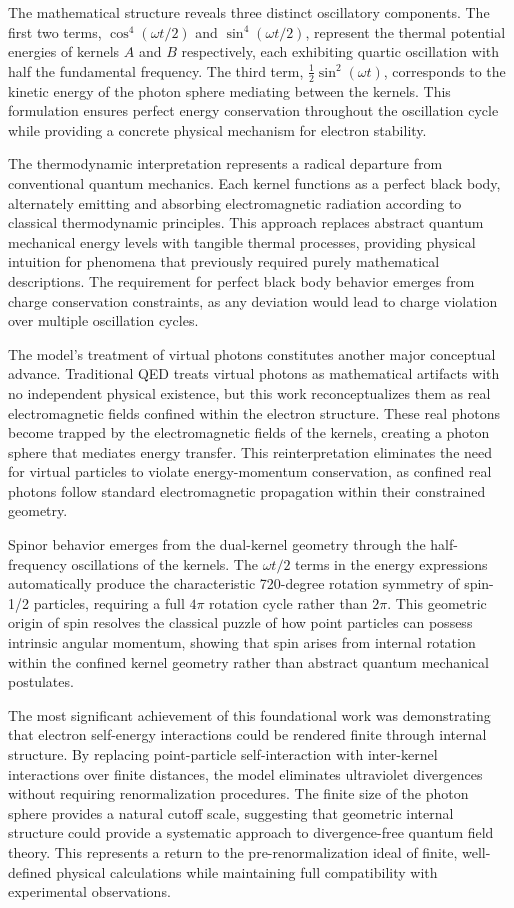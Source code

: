 \documentclass[%
 reprint,
 amsmath,amssymb,
 aps,
]{revtex4-1}
\numberwithin{equation}{section}%
\begin{document}
The mathematical structure reveals three distinct oscillatory components. The first two terms, $\cos^4(\omega t/2)$ and $\sin^4(\omega t/2)$, represent the thermal potential energies of kernels $A$ and $B$ respectively, each exhibiting quartic oscillation with half the fundamental frequency. The third term, $\frac{1}{2}\sin^2(\omega t)$, corresponds to the kinetic energy of the photon sphere mediating between the kernels. This formulation ensures perfect energy conservation throughout the oscillation cycle while providing a concrete physical mechanism for electron stability.

The thermodynamic interpretation represents a radical departure from conventional quantum mechanics. Each kernel functions as a perfect black body, alternately emitting and absorbing electromagnetic radiation according to classical thermodynamic principles. This approach replaces abstract quantum mechanical energy levels with tangible thermal processes, providing physical intuition for phenomena that previously required purely mathematical descriptions. The requirement for perfect black body behavior emerges from charge conservation constraints, as any deviation would lead to charge violation over multiple oscillation cycles.

The model's treatment of virtual photons constitutes another major conceptual advance. Traditional QED treats virtual photons as mathematical artifacts with no independent physical existence, but this work reconceptualizes them as real electromagnetic fields confined within the electron structure. These real photons become trapped by the electromagnetic fields of the kernels, creating a photon sphere that mediates energy transfer. This reinterpretation eliminates the need for virtual particles to violate energy-momentum conservation, as confined real photons follow standard electromagnetic propagation within their constrained geometry.

Spinor behavior emerges from the dual-kernel geometry through the half-frequency oscillations of the kernels. The $\omega t/2$ terms in the energy expressions automatically produce the characteristic 720-degree rotation symmetry of spin-1/2 particles, requiring a full $4\pi$ rotation cycle rather than $2\pi$. This geometric origin of spin resolves the classical puzzle of how point particles can possess intrinsic angular momentum, showing that spin arises from internal rotation within the confined kernel geometry rather than abstract quantum mechanical postulates.

The most significant achievement of this foundational work was demonstrating that electron self-energy interactions could be rendered finite through internal structure. By replacing point-particle self-interaction with inter-kernel interactions over finite distances, the model eliminates ultraviolet divergences without requiring renormalization procedures. The finite size of the photon sphere provides a natural cutoff scale, suggesting that geometric internal structure could provide a systematic approach to divergence-free quantum field theory. This represents a return to the pre-renormalization ideal of finite, well-defined physical calculations while maintaining full compatibility with experimental observations.
\end{document}
